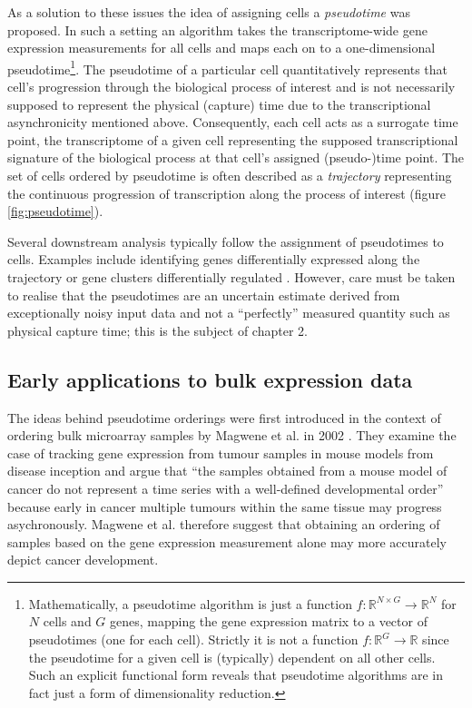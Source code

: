 As a solution to these issues the idea of assigning cells a \emph{pseudotime} was proposed. In such a setting an algorithm takes the transcriptome-wide gene expression measurements for all cells and maps each on to a one-dimensional pseudotime\footnote{Mathematically, a pseudotime algorithm is just a function $f: \mathbb{R}^{N\times G} \rightarrow \mathbb{R}^N$ for $N$ cells and $G$ genes, mapping the gene expression matrix to a vector of pseudotimes (one for each cell). Strictly it is not a function $f: \mathbb{R}^G \rightarrow \mathbb{R}$ since the pseudotime for a given cell is (typically) dependent on all other cells. Such an explicit functional form reveals that pseudotime algorithms are in fact just a form of dimensionality reduction.}.
The pseudotime of a particular cell quantitatively represents that cell's progression through the biological process of interest and is not necessarily supposed to represent the physical (capture) time due to the transcriptional asynchronicity mentioned above. Consequently, each cell acts as a surrogate time point, the transcriptome of a given cell representing the supposed transcriptional signature of the biological process at that cell's assigned (pseudo-)time point. The set of cells ordered by pseudotime is often described as a \emph{trajectory} representing the continuous progression of transcription along the process of interest (figure \ref{fig:pseudotime}).

Several downstream analysis typically follow the assignment of pseudotimes to cells. Examples include identifying genes differentially expressed along the trajectory \cite{campbell2016switchde} or gene clusters differentially regulated \cite{Trapnell2014-xi}. However, care must be taken to realise that the pseudotimes are an uncertain estimate derived from exceptionally noisy input data and not a ``perfectly'' measured quantity such as physical capture time; this is the subject of chapter 2.

\subsection{Early applications to bulk expression data} \label{sec:int:early}

The ideas behind pseudotime orderings were first introduced in the context of ordering bulk microarray samples by Magwene et al. in 2002 \cite{Magwene2003-bm}. They examine the case of tracking gene expression from tumour samples in mouse models from disease inception and argue that ``the samples obtained from a mouse model of cancer do not represent a time series with a well-defined developmental order''
because early in cancer multiple tumours within the same tissue may progress asychronously. Magwene et al. therefore suggest that obtaining an ordering of samples based on the gene expression measurement alone may more accurately depict cancer development.

